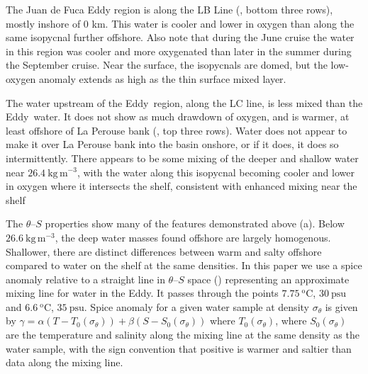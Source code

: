\documentclass[draft]{agujournal2019}
\newcommand*{\Eddy}{{\sc Eddy}}
\begin{document}
The Juan de Fuca Eddy region is along the LB Line (, bottom three rows), mostly inshore of 0 km. This water is cooler and lower in oxygen than along the same isopycnal further offshore.  Also note that during the June cruise the water in this region was cooler and more oxygenated than later in the summer during the September cruise.  Near the surface, the isopycnals are domed, but the low-oxygen anomaly extends as high as the thin surface mixed layer.

The water upstream of the \Eddy\ region, along the LC line, is less mixed than the \Eddy\ water.  It does not show as much drawdown of oxygen, and is warmer, at least offshore of La Perouse bank (, top three rows).  Water does not appear to make it over La Perouse bank into the basin onshore, or if it does, it does so intermittently.  There appears to be some mixing of the deeper and shallow water near $26.4\ \mathrm{kg\,m^{-3}}$, with the water along this isopycnal becoming cooler and lower in oxygen where it intersects the shelf, consistent with enhanced mixing near the shelf

The $\theta$--$S$ properties show many of the features demonstrated above (a).  Below $26.6\ \mathrm{kg\,m^{-3}}$, the deep water masses found offshore are largely homogenous. Shallower, there are distinct differences between warm and salty offshore compared to water on the shelf at the same densities. In this paper we use a spice anomaly relative to a straight line in $\theta$--$S$ space () representing an approximate mixing line for water in the \Eddy. It passes through the points $7.75\ \mathrm{^oC}$, $30\ \mathrm{psu}$ and $6.6\ \mathrm{^oC}$, $35\ \mathrm{psu}$. Spice anomaly for a given water sample at density $\sigma_{\theta}$ is given by $\gamma = \alpha \left(T - T_0\left(\sigma_{\theta}\right)\right) + \beta \left(S - S_0\left(\sigma_{\theta}\right)\right)$ where $T_0\left(\sigma_{\theta}\right)$, where $S_0\left(\sigma_{\theta}\right)$ are the temperature and salinity along the mixing line at the same density as the water sample, with the sign convention that positive is warmer and saltier than data along the mixing line.
\end{document}
